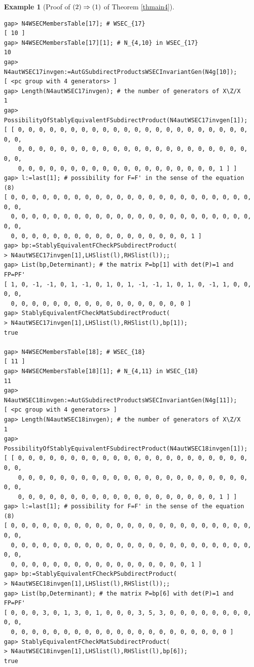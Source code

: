 \documentclass{amsart}
\theoremstyle{plain}
\theoremstyle{definition}
\newtheorem{example}[theorem]{Example}
\theoremstyle{remark}
\begin{document}
\begin{example}[Proof of ${\rm (2)}\Rightarrow {\rm (1)}$ of {Theorem \ref{thmain4}}]
\begin{verbatim}
gap> N4WSECMembersTable[17]; # WSEC_{17}
[ 10 ]
gap> N4WSECMembersTable[17][1]; # N_{4,10} in WSEC_{17}
10
gap> N4autWSEC17invgen:=AutGSubdirectProductsWSECInvariantGen(N4g[10]);
[ <pc group with 4 generators> ]
gap> Length(N4autWSEC17invgen); # the number of generators of X\Z/X
1
gap> PossibilityOfStablyEquivalentFSubdirectProduct(N4autWSEC17invgen[1]);
[ [ 0, 0, 0, 0, 0, 0, 0, 0, 0, 0, 0, 0, 0, 0, 0, 0, 0, 0, 0, 0, 0, 0, 0, 0, 
    0, 0, 0, 0, 0, 0, 0, 0, 0, 0, 0, 0, 0, 0, 0, 0, 0, 0, 0, 0, 0, 0, 0, 0, 
    0, 0, 0, 0, 0, 0, 0, 0, 0, 0, 0, 0, 0, 0, 0, 0, 0, 0, 0, 1 ] ]
gap> l:=last[1]; # possibility for F=F' in the sense of the equation (8)
[ 0, 0, 0, 0, 0, 0, 0, 0, 0, 0, 0, 0, 0, 0, 0, 0, 0, 0, 0, 0, 0, 0, 0, 0, 0, 
  0, 0, 0, 0, 0, 0, 0, 0, 0, 0, 0, 0, 0, 0, 0, 0, 0, 0, 0, 0, 0, 0, 0, 0, 0, 
  0, 0, 0, 0, 0, 0, 0, 0, 0, 0, 0, 0, 0, 0, 0, 0, 0, 1 ]
gap> bp:=StablyEquivalentFCheckPSubdirectProduct(
> N4autWSEC17invgen[1],LHSlist(l),RHSlist(l));;
gap> List(bp,Determinant); # the matrix P=bp[1] with det(P)=1 and FP=PF'
[ 1, 0, -1, -1, 0, 1, -1, 0, 1, 0, 1, -1, -1, 1, 0, 1, 0, -1, 1, 0, 0, 0, 0, 
  0, 0, 0, 0, 0, 0, 0, 0, 0, 0, 0, 0, 0, 0, 0, 0, 0 ]
gap> StablyEquivalentFCheckMatSubdirectProduct(
> N4autWSEC17invgen[1],LHSlist(l),RHSlist(l),bp[1]);
true

gap> N4WSECMembersTable[18]; # WSEC_{18}
[ 11 ]
gap> N4WSECMembersTable[18][1]; # N_{4,11} in WSEC_{18}
11
gap> N4autWSEC18invgen:=AutGSubdirectProductsWSECInvariantGen(N4g[11]);
[ <pc group with 4 generators> ]
gap> Length(N4autWSEC18invgen); # the number of generators of X\Z/X
1
gap> PossibilityOfStablyEquivalentFSubdirectProduct(N4autWSEC18invgen[1]);
[ [ 0, 0, 0, 0, 0, 0, 0, 0, 0, 0, 0, 0, 0, 0, 0, 0, 0, 0, 0, 0, 0, 0, 0, 0, 
    0, 0, 0, 0, 0, 0, 0, 0, 0, 0, 0, 0, 0, 0, 0, 0, 0, 0, 0, 0, 0, 0, 0, 0, 
    0, 0, 0, 0, 0, 0, 0, 0, 0, 0, 0, 0, 0, 0, 0, 0, 0, 0, 0, 1 ] ]
gap> l:=last[1]; # possibility for F=F' in the sense of the equation (8)
[ 0, 0, 0, 0, 0, 0, 0, 0, 0, 0, 0, 0, 0, 0, 0, 0, 0, 0, 0, 0, 0, 0, 0, 0, 0, 
  0, 0, 0, 0, 0, 0, 0, 0, 0, 0, 0, 0, 0, 0, 0, 0, 0, 0, 0, 0, 0, 0, 0, 0, 0, 
  0, 0, 0, 0, 0, 0, 0, 0, 0, 0, 0, 0, 0, 0, 0, 0, 0, 1 ]
gap> bp:=StablyEquivalentFCheckPSubdirectProduct(
> N4autWSEC18invgen[1],LHSlist(l),RHSlist(l));;
gap> List(bp,Determinant); # the matrix P=bp[6] with det(P)=1 and FP=PF'
[ 0, 0, 0, 3, 0, 1, 3, 0, 1, 0, 0, 0, 3, 5, 3, 0, 0, 0, 0, 0, 0, 0, 0, 0, 0, 
  0, 0, 0, 0, 0, 0, 0, 0, 0, 0, 0, 0, 0, 0, 0, 0, 0, 0, 0, 0, 0 ]
gap> StablyEquivalentFCheckMatSubdirectProduct(
> N4autWSEC18invgen[1],LHSlist(l),RHSlist(l),bp[6]);
true


\end{verbatim}
\end{example}
\end{document}
